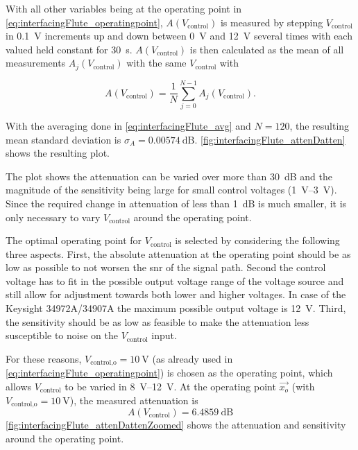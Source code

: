 With all other variables being at the operating point in \autoref{eq:interfacingFlute_operatingpoint}, $A(V_\text{control})$ is measured by stepping $V_\text{control}$ in \SI{0.1}{\volt} increments up and down between \SI{0}{\volt} and \SI{12}{\volt} several times with each valued held constant for \SI{30}{\second}. $A(V_\text{control})$ is then calculated as the mean of all measurements $A_j(V_\text{control})$ with the same $V_\text{control}$ with

\begin{equation}\label{eq:interfacingFlute_avg}
A(V_\text{control}) = \frac{1}{N} \sum_{j=0}^{N-1} A_j(V_\text{control}).
\end{equation}

With the averaging done in \autoref{eq:interfacingFlute_avg} and $N=120$, the resulting mean standard deviation is $\sigma_A=\SI{0.00574}{\dB}$.
\autoref{fig:interfacingFlute_attenDatten} shows the resulting plot.

The plot shows the attenuation can be varied over more than \SI{30}{\dB} and the magnitude of the sensitivity being large for small control voltages (\SIrange{1}{3}{\volt}).
Since the required change in attenuation of less than \SI{1}{\dB} is much smaller, it is only necessary to vary $V_\text{control}$ around the operating point.

The optimal operating point for $V_\text{control}$ is selected by considering the following three aspects.
First, the absolute attenuation at the operating point should be as low as possible to not worsen the \gls{snr} of the signal path. Second the control voltage has to fit in the possible output voltage range of the voltage source and still allow for adjustment towards both lower and higher voltages. 
In case of the Keysight 34972A/34907A the maximum possible output voltage is \SI{12}{\volt}.
Third, the sensitivity should be as low as feasible to make the attenuation less susceptible to noise on the $V_\text{control}$ input.


For these reasons, $V_\text{control,o}=\SI{10}{\volt}$ (as already used in \autoref{eq:interfacingFlute_operatingpoint}) is chosen as the operating point, which allows $V_\text{control}$ to be varied in \SIrange{8}{12}{\volt}.
At the operating point $\vec{x_o}$ (with $V_\text{control,o}=\SI{10}{\volt}$), the measured attenuation is
\begin{equation}
A(V_\text{control})=\SI{6.4859}{\dB}
\end{equation}
\autoref{fig:interfacingFlute_attenDattenZoomed} shows the attenuation and sensitivity around the operating point.

